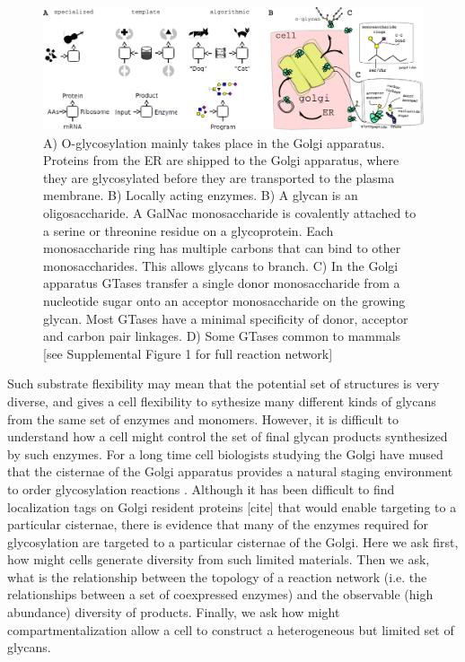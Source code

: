 \documentclass[twocolumn]{article}
\begin{document}
\begin{figure}
    \includegraphics[width=\textwidth]{Figure_1.pdf}
	\caption{A) O-glycosylation mainly takes place in the Golgi apparatus. Proteins from the ER are shipped to the Golgi apparatus, where they are glycosylated before they are transported to the plasma membrane.  B) Locally acting enzymes. B) A glycan is an oligosaccharide. A GalNac monosaccharide is covalently attached to a serine or threonine residue on a glycoprotein. Each monosaccharide ring has multiple carbons that can bind to other monosaccharides. This allows glycans to branch. C) In the Golgi apparatus GTases transfer a single donor monosaccharide from a nucleotide sugar onto an acceptor monosaccharide on the growing glycan. Most GTases have a minimal specificity of donor, acceptor and carbon pair linkages. D) Some GTases common to mammals [see Supplemental Figure 1 for full reaction network]}
\end{figure}

Such substrate flexibility may mean that the potential set of structures is very diverse, and gives a cell flexibility to sythesize many different kinds of glycans from the same set of enzymes and monomers. However, it is difficult to understand how a cell might control the set of final glycan products synthesized by such enzymes. For a long time cell biologists studying the Golgi have mused that the cisternae of the Golgi apparatus provides a natural staging environment to order glycosylation reactions \cite{Dunphy1985}. Although it has been difficult to find localization tags on Golgi resident proteins [cite] that would enable targeting to a particular cisternae, there is evidence that many of the enzymes required for glycosylation are targeted to a particular cisternae of the Golgi. Here we ask first, how might cells generate diversity from such limited materials. Then we ask, what is the relationship between the topology of a reaction network (i.e. the relationships between a set of coexpressed enzymes) and the observable (high abundance) diversity of products.  Finally, we ask how might compartmentalization allow a cell to construct a heterogeneous but limited set of glycans.
\end{document}
